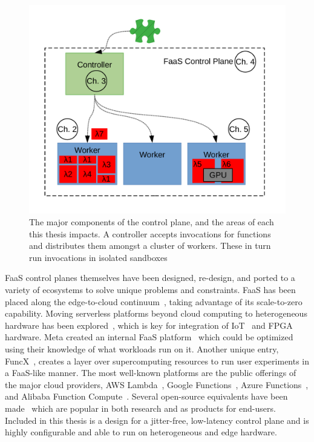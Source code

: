 \begin{figure}
  \centering
  \includegraphics[width=\textwidth]{introduction/figs/faas-labeled.pdf}
  \caption{The major components of the control plane, and the areas of each this thesis impacts. A controller accepts invocations for functions and distributes them amongst a cluster of workers. These in turn run invocations in isolated sandboxes}
  \label{fig:control-plane}
\end{figure}

FaaS control planes themselves have been designed, re-design, and ported to a variety of ecosystems to solve unique problems and constraints.
FaaS has been placed along the edge-to-cloud continuum~\cite{cicconetti2020decentralized,russo2023serverless,cheng2019fog,wang2020supporting}, taking advantage of its scale-to-zero capability.
Moving serverless platforms beyond cloud computing to heterogeneous hardware has been explored~\cite{du2022serverless}, which is key for integration of IoT~\cite{persson2017kappa,trilles2020iot,cheng2019fog,wang2020supporting} and FPGA~\cite{bacis2020blastfunction,ringlein2021case} hardware.
Meta created an internal FaaS platform~\cite{sahraei2023xfaas} which could be optimized using their knowledge of what workloads run on it.
Another unique entry, FuncX~\cite{funcx_hpdc_20}, creates a layer over supercomputing resources to run user experiments in a FaaS-like manner.
The most well-known platforms are the public offerings of the major cloud providers, AWS Lambda~\cite{lambda}, Google Functions~\cite{gcp-functions}, Azure Functions~\cite{azure-functions}, and Alibaba Function Compute~\cite{alibaba-compute}.
Several open-source equivalents have been made~\cite{openwhisk,openfaas,nuclio,knative} which are popular in both research and as products for end-users.
Included in this thesis is a design for a jitter-free, low-latency control plane and is highly configurable and able to run on heterogeneous and edge hardware.

